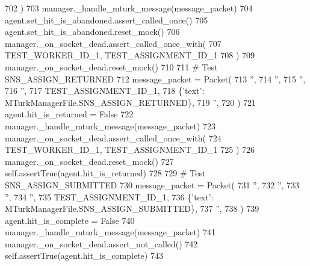 \begin{DoxyCode}
702         )
703         manager.\_handle\_mturk\_message(message\_packet)
704         agent.set\_hit\_is\_abandoned.assert\_called\_once()
705         agent.set\_hit\_is\_abandoned.reset\_mock()
706         manager.\_on\_socket\_dead.assert\_called\_once\_with(
707             TEST\_WORKER\_ID\_1, TEST\_ASSIGNMENT\_ID\_1
708         )
709         manager.\_on\_socket\_dead.reset\_mock()
710 
711         \textcolor{comment}{# Test SNS\_ASSIGN\_RETURNED}
712         message\_packet = Packet(
713             \textcolor{stringliteral}{''},
714             \textcolor{stringliteral}{''},
715             \textcolor{stringliteral}{''},
716             \textcolor{stringliteral}{''},
717             TEST\_ASSIGNMENT\_ID\_1,
718             \{\textcolor{stringliteral}{'text'}: MTurkManagerFile.SNS\_ASSIGN\_RETURNED\},
719             \textcolor{stringliteral}{''},
720         )
721         agent.hit\_is\_returned = \textcolor{keyword}{False}
722         manager.\_handle\_mturk\_message(message\_packet)
723         manager.\_on\_socket\_dead.assert\_called\_once\_with(
724             TEST\_WORKER\_ID\_1, TEST\_ASSIGNMENT\_ID\_1
725         )
726         manager.\_on\_socket\_dead.reset\_mock()
727         self.assertTrue(agent.hit\_is\_returned)
728 
729         \textcolor{comment}{# Test SNS\_ASSIGN\_SUBMITTED}
730         message\_packet = Packet(
731             \textcolor{stringliteral}{''},
732             \textcolor{stringliteral}{''},
733             \textcolor{stringliteral}{''},
734             \textcolor{stringliteral}{''},
735             TEST\_ASSIGNMENT\_ID\_1,
736             \{\textcolor{stringliteral}{'text'}: MTurkManagerFile.SNS\_ASSIGN\_SUBMITTED\},
737             \textcolor{stringliteral}{''},
738         )
739         agent.hit\_is\_complete = \textcolor{keyword}{False}
740         manager.\_handle\_mturk\_message(message\_packet)
741         manager.\_on\_socket\_dead.assert\_not\_called()
742         self.assertTrue(agent.hit\_is\_complete)
743 
\end{DoxyCode}
\mbox{\label{classparlai_1_1mturk_1_1core_1_1legacy__2018_1_1test_1_1test__mturk__manager_1_1TestMTurkManagerUnitFunctions_a9ee774a6ffe10ccade872aa86b319781}} 
